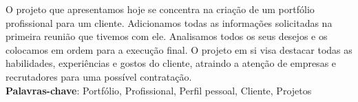 \begin{thesisresumo}
O projeto que apresentamos hoje se concentra na criação de um portfólio profissional para um cliente. Adicionamos todas as informações solicitadas na primeira reunião que tivemos com ele. Analisamos todos os seus desejos e os colocamos em ordem para a execução final. O projeto em si visa destacar todas as habilidades, experiências e gostos do cliente, atraindo a atenção de empresas e recrutadores para uma possível contratação.
\ \\


\textbf{Palavras-chave}: Portfólio, Profissional, Perfil pessoal, Cliente, Projetos

\end{thesisresumo}
